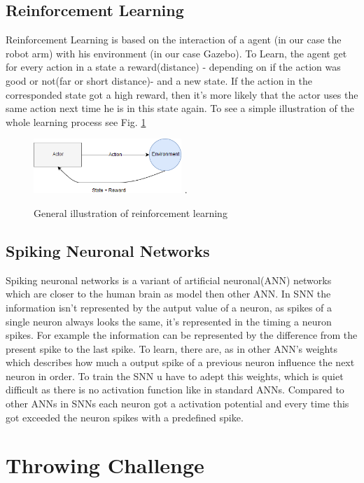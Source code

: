 \subsection{Reinforcement Learning}
Reinforcement Learning is based on the interaction of a agent (in our case the robot arm) with his environment (in our case Gazebo). To Learn, the agent get for every action in a state a reward(distance) - depending on if the action was good or not(far or short distance)- and a new state. If the action in the corresponded state got a high reward, then it's more likely that the actor uses the same action next time he is in this state again. To see a simple illustration of the whole learning process see Fig. \ref{re_base}
\begin{figure}[H]
	\centering
	\includegraphics[width=2.2in]{img/re_base.png}
	\DeclareGraphicsExtensions.
	\caption{General illustration of reinforcement learning}
	\label{re_base}
\end{figure}

\subsection{Spiking Neuronal Networks}
Spiking neuronal networks is a variant of artificial neuronal(ANN) networks which are closer to the human brain as model then other ANN. In SNN the information isn't represented by the autput value of a neuron, as spikes of a single neuron always looks the same, it's represented in the timing a neuron spikes. For example the information can be represented by the difference from the present spike to the last spike. To learn, there are, as in other ANN's weights which describes how much a output spike of a previous neuron influence the next neuron in order. To train the SNN u have to adept this weights, which is quiet difficult as there is no activation function like in standard ANNs. Compared to other ANNs in SNNs each neuron got a activation potential and every time this got exceeded the neuron spikes with a predefined spike.

\section{Throwing Challenge}
